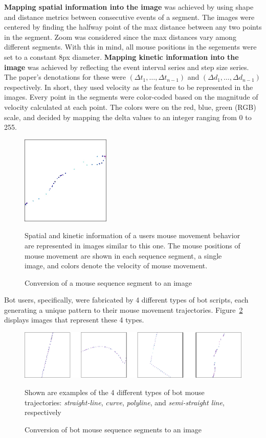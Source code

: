 \textbf{Mapping spatial information into the image} was achieved by using shape and distance metrics between consecutive events of a segment.
The images were centered by finding the halfway point of the max distance between any two points in the segment.
Zoom was considered since the max distances vary among different segments.
With this in mind, all mouse positions in the segements were set to a constant 8px diameter.
\textbf{Mapping kinetic information into the image} was achieved by reflecting the event interval series and step size series.
The paper's denotations for these were $({\Delta}t_1,\dots,{\Delta}t_{n-1})$ and $({\Delta}d_1,\dots,{\Delta}d_{n-1})$ respectively.
In short, they used velocity as the feature to be represented in the images.
Every point in the segments were color-coded based on the magnitude of velocity calculated at each point.
The colors were on the red, blue, green (RGB) scale, and decided by mapping the delta values to an integer ranging from 0 to 255.
\begin{figure}[!h]
    \centering
    \includegraphics[width=.35\columnwidth]{figures/deep_learning_with_mouse_dynamics_mouse_segment_image_generation}
    \caption{Conversion of a mouse sequence segment to an image}
    \label{fig:deep-learning-image-generation}
    {\small Spatial and kinetic information of a users mouse movement behavior are represented in images similar to this one. The mouse positions of mouse movement are shown in each sequence segment, a single image, and colors denote the velocity of mouse movement.}
\end{figure}
Bot users, specifically, were fabricated by 4 different types of bot scripts, each generating a unique pattern to their mouse movement trajectories.
Figure~\ref{fig:deep-learning-image-generation-bots} displays images that represent these 4 types.
\begin{figure}[!h]
    \centering
    \includegraphics[width=1\columnwidth]{figures/deep_learning_with_mouse_dynamics_mouse_segment_image_generation_bots}
    \caption{Conversion of bot mouse sequence segments to an image}
    \label{fig:deep-learning-image-generation-bots}
    {\small Shown are examples of the 4 different types of bot mouse trajectories: \textit{straight-line}, \textit{curve}, \textit{polyline}, and \textit{semi-straight line}, respectively}
\end{figure}
